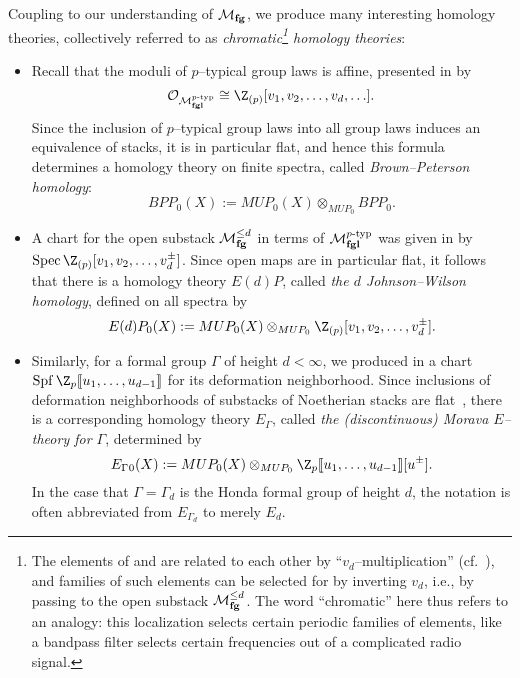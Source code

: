 \begin{definition}\label{DefnChromaticHomologyThys}
Coupling  to our understanding of $\mathcal{M}_{\mathbf{fg}}$, we produce many interesting homology theories, collectively referred to as \textit{chromatic\footnote{The elements of  and  are related to each other by ``$v_d$--multiplication'' (cf.\ ), and families of such elements can be selected for by inverting $v_d$, i.e., by passing to the open substack $\mathcal{M}_{\mathbf{fg}}^{\le d}$.  The word ``chromatic'' here thus refers to an analogy: this localization selects certain periodic families of elements, like a bandpass filter selects certain frequencies out of a complicated radio signal.} homology theories}:
\begin{itemize}
\item Recall that the moduli of $p$--typical group laws is affine, presented in  by \[\sheaf O_{\moduli{fgl}^{\ptyp}} \cong \Z_{(p)}[v_1, v_2, \ldots, v_d, \ldots].\]  Since the inclusion of $p$--typical group laws into all group laws induces an equivalence of stacks, it is in particular flat, and hence this formula determines a homology theory on finite spectra, called \textit{Brown--Peterson homology}: \[BPP_0(X) := MUP_0(X) \otimes_{MUP_0} BPP_0.\]
\item A chart for the open substack $\mathcal{M}_{\mathbf{fg}}^{\le d}$ in terms of $\mathcal{M}_{\mathbf{fgl}}^{p\text{-}\mathrm{typ}}$ was given in  by $\Spec \Z_{(p)}[v_1, v_2, \ldots, v_d^\pm]$.  Since open maps are in particular flat, it follows that there is a homology theory $E(d)P$, called \textit{the $d${\th} Johnson--Wilson homology}, defined on all spectra by \[E(d)P_0(X) := MUP_0(X) \otimes_{MUP_0} \Z_{(p)}[v_1, v_2, \ldots, v_d^\pm].\]
\item Similarly, for a formal group $\Gamma$ of height $d < \infty$, we produced in  a chart $\Spf \Z_p\ps{u_1, \ldots, u_{d-1}}$ for its deformation neighborhood.  Since inclusions of deformation neighborhoods of substacks of Noetherian stacks are flat~\cite{Matsumura}, there is a corresponding homology theory $E_\Gamma{}$, called \textit{the (discontinuous) Morava $E$--theory for $\Gamma$}, determined by \[E_\Gamma{}_0(X) := MUP_0(X) \otimes_{MUP_0} \Z_p\ps{u_1, \ldots, u_{d-1}}[u^\pm].\]  In the case that $\Gamma = \Gamma_d$ is the Honda formal group of height $d$, the notation is often abbreviated from $E_{\Gamma_d}$ to merely $E_d$.

\end{itemize}
\end{definition}
